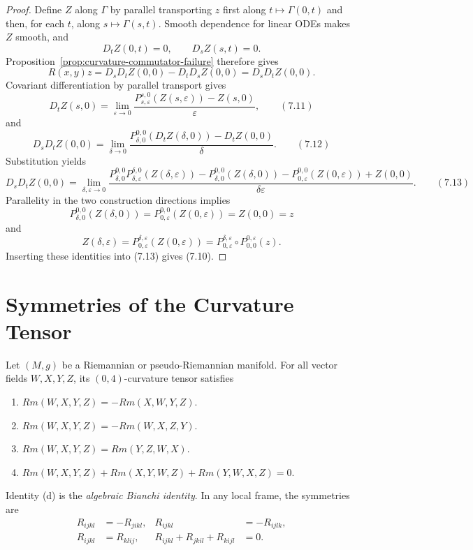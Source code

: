 \begin{proof}
\sketch Define $Z$ along $\Gamma$ by parallel transporting $z$ first along
$t\mapsto\Gamma(0,t)$ and then, for each $t$, along
$s\mapsto\Gamma(s,t)$. Smooth dependence for linear ODEs makes $Z$ smooth,
and
\[
D_tZ(0,t)=0,
\qquad D_sZ(s,t)=0.
\]
Proposition~\ref{prop:curvature-commutator-failure} therefore gives
\[
R(x,y)z=D_sD_tZ(0,0)-D_tD_sZ(0,0)=D_sD_tZ(0,0).
\]
Covariant differentiation by parallel transport gives
\[
D_tZ(s,0)=\lim_{\varepsilon\to0}
\frac{P_{s,\varepsilon}^{s,0}(Z(s,\varepsilon))-Z(s,0)}{\varepsilon},
\qquad (7.11)
\]
and
\[
D_sD_tZ(0,0)=\lim_{\delta\to0}
\frac{P_{\delta,0}^{0,0}(D_tZ(\delta,0))-D_tZ(0,0)}{\delta}.
\qquad (7.12)
\]
Substitution yields
\[
D_sD_tZ(0,0)
=\lim_{\delta,\varepsilon\to0}
\frac{
P_{\delta,0}^{0,0}P_{\delta,\varepsilon}^{\delta,0}(Z(\delta,\varepsilon))
-P_{\delta,0}^{0,0}(Z(\delta,0))
-P_{0,\varepsilon}^{0,0}(Z(0,\varepsilon))
+Z(0,0)
}{\delta\varepsilon}.
\qquad (7.13)
\]
Parallelity in the two construction directions implies
\[
P_{\delta,0}^{0,0}(Z(\delta,0))
=P_{0,\varepsilon}^{0,0}(Z(0,\varepsilon))
=Z(0,0)=z
\]
and
\[
Z(\delta,\varepsilon)
=P_{0,\varepsilon}^{\delta,\varepsilon}(Z(0,\varepsilon))
=P_{0,\varepsilon}^{\delta,\varepsilon}
 \circ P_{0,0}^{0,\varepsilon}(z).
\]
Inserting these identities into (7.13) gives (7.10).
\end{proof}
\section{Symmetries of the Curvature Tensor}

\begin{proposition}
\label{prop:curvature-tensor-symmetries}

Let $(M,g)$ be a Riemannian or pseudo-Riemannian manifold. For all vector
fields $W,X,Y,Z$, its $(0,4)$-curvature tensor satisfies
\begin{enumerate}[label=(\alph*)]
\item $Rm(W,X,Y,Z)=-Rm(X,W,Y,Z)$.
\item $Rm(W,X,Y,Z)=-Rm(W,X,Z,Y)$.
\item $Rm(W,X,Y,Z)=Rm(Y,Z,W,X)$.
\item $Rm(W,X,Y,Z)+Rm(X,Y,W,Z)+Rm(Y,W,X,Z)=0$.
\end{enumerate}
\end{proposition}

Identity (d) is the \emph{algebraic Bianchi identity}. In any local frame,
the symmetries are
\begin{align*}
R_{ijkl}&=-R_{jikl},&
R_{ijkl}&=-R_{ijlk},\\
R_{ijkl}&=R_{klij},&
R_{ijkl}+R_{jkil}+R_{kijl}&=0.
\end{align*}

